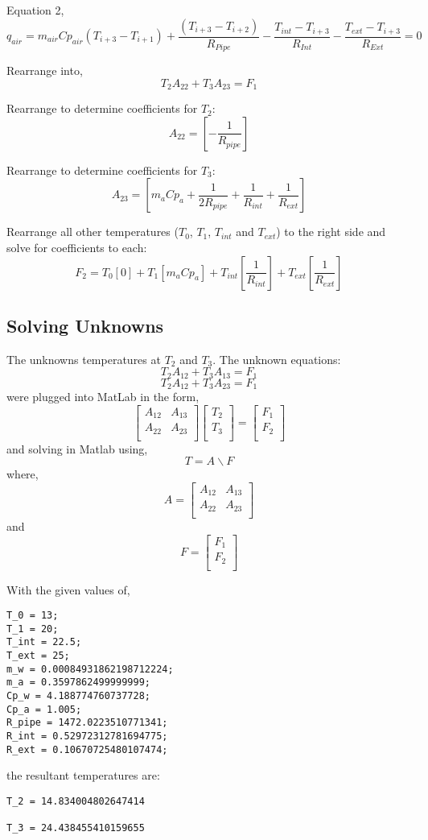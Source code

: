 \documentclass[12pt]{report}
\begin{document}
Equation 2, 
$$ q_{air} = m_{air} Cp_{air} (T_{i+3}-T_{i+1}) 
+ \frac{
	\left( 
	T_{i+3} 
	- T_{i+2}
	\right)}
{R_{Pipe}} 
- \frac{T_{int} - T_{i+3}}{R_{Int}}
- \frac{T_{ext} - T_{i+3}}{R_{Ext}} = 0 $$

Rearrange into,
$$ T_2 A_{22} + T_3 A_{23} = F_1 $$

Rearrange to determine coefficients for $T_2$:
$$ A_{22} = [- \frac{1}{R_{pipe}}] $$

Rearrange to determine coefficients for $T_3$:
$$ A_{23} = [ m_a Cp_a + \frac{1}{2 R_{pipe}} + \frac{1}{R_{int}} + \frac{1}{R_{ext}}] $$

Rearrange all other temperatures ($T_0$, $T_1$, $T_{int}$ and $T_{ext}$) to the right side and solve for coefficients to each:
$$ F_2 = 
	T_0 [0] 
	+ T_1 [m_a Cp_a] 
	+ T_{int} [\frac{1}{R_{int}}]
	+ T_{ext} [\frac{1}{R_{ext}}]$$


\subsection{Solving Unknowns}
The unknowns temperatures at $T_2$ and $T_3$. The unknown equations: 
$$ T_2 A_{12} + T_3 A_{13} = F_1 $$
$$ T_2 A_{12} + T_3 A_{23} = F_1 $$
were plugged into MatLab in the form, 
$$
\left[ \begin{matrix}
A_{12} & A_{13} \\
A_{22} & A_{23} \\
\end{matrix}\right] 
\left[ \begin{matrix}
T_{2} \\
T_{3} \\
\end{matrix}
\right] 
= \left[ \begin{matrix}
F_1 \\
F_2 \\
\end{matrix}
\right]
$$
and solving in Matlab using,
$$ T = A \backslash F $$
where, 
$$ A = \left[ \begin{matrix}
A_{12} & A_{13} \\
A_{22} & A_{23} \\
\end{matrix}\right] $$
and
$$ F = \left[ \begin{matrix}
F_1 \\
F_2 \\
\end{matrix}
\right] $$

With the given values of,
\begin{lstlisting}
T_0 = 13;
T_1 = 20;
T_int = 22.5;
T_ext = 25;
m_w = 0.00084931862198712224;
m_a = 0.3597862499999999;
Cp_w = 4.188774760737728;
Cp_a = 1.005; 
R_pipe = 1472.0223510771341;
R_int = 0.52972312781694775;
R_ext = 0.10670725480107474;
\end{lstlisting}
the resultant temperatures are:
\begin{lstlisting}
T_2 = 14.834004802647414

T_3 = 24.438455410159655
\end{lstlisting}


        
\end{document}
